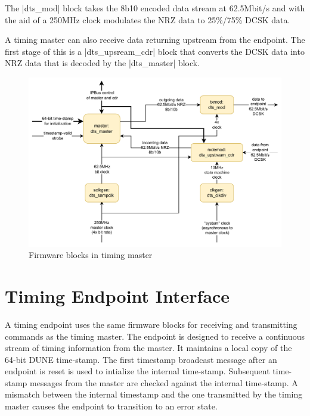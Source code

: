 \documentclass{dune}
\begin{document}
The |dts_mod| block takes the 8b10 encoded data stream at 62.5Mbit/s and with the aid of a 250MHz clock modulates the NRZ data to 25\%/75\% DCSK data.


A timing master can also receive data returning upstream from the endpoint. The first stage of this is a |dts_upsream_cdr| block that converts the DCSK data into NRZ data that is decoded by the |dts_master| block.


\begin{figure}[h!]
    \centering
    \includegraphics{dune_timing_system_master_dcsk_drawio.pdf}
    \caption{Firmware blocks in timing master}
    \label{fig:tx_master}
\end{figure}


\section{Timing Endpoint Interface}

A timing endpoint uses the same firmware blocks for receiving and transmitting commands as the timing master. The endpoint is designed to receive a continuous stream of timing information from the master. It maintains a local copy of the 64-bit DUNE time-stamp. The first timestamp broadcast message after an endpoint is reset is used to intialize the internal time-stamp. Subsequent time-stamp messages from the master are checked against the internal time-stamp. A mismatch between the internal timestamp and the one transmitted by the timing master causes the endpoint to transition to an error state. 
\end{document}
